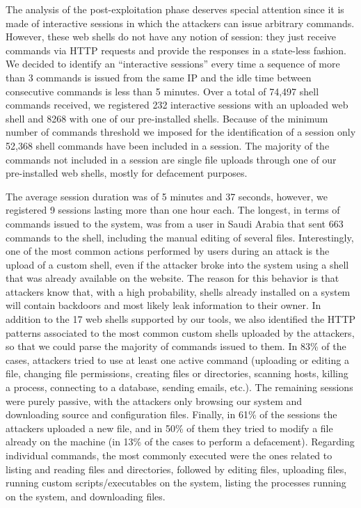 The analysis of the post-exploitation phase deserves special attention since it is made of interactive sessions in which the attackers can issue arbitrary commands. However, these web shells do not have any notion of session: they just receive commands via HTTP requests and provide the responses in a state-less fashion. We decided to identify an ``interactive sessions'' every time a sequence of more than 3 commands is issued from the same IP and the idle time between consecutive commands is less than 5 minutes.
Over a total of 74,497 shell commands received, we registered 232 interactive sessions with an uploaded web shell and 8268 with one of our pre-installed shells. Because of the minimum number of commands threshold we imposed for the identification of a session only 52,368 shell commands have been included in a session. The majority of the commands not included in a session are single file uploads through one of our pre-installed web shells, mostly for defacement purposes.

The average session duration was of 5 minutes and 37 seconds, however, we registered 9 sessions lasting more than one hour each. The longest, in terms of commands issued to the system, was from a user in Saudi Arabia that sent 663 commands to the shell, including the manual editing of several files. Interestingly, one of the most common actions performed by users during an attack is the upload of a custom shell, even if the attacker broke into the system using a shell that was already available on the website. The reason for this behavior is that attackers know that, with a high probability, shells already installed on a system will contain backdoors and most likely leak information to their owner. In addition to the 17 web shells supported by our tools, we also identified the HTTP patterns associated to the most common custom shells uploaded by the attackers, so that we could parse the majority of commands issued to them.
In 83\% of the cases, attackers tried to use at least one active command (uploading or editing a file, changing file permissions, creating files or directories, scanning hosts, killing a process, connecting to a database, sending emails, etc.). The remaining sessions were purely passive, with the attackers only browsing our system and downloading source and configuration files.
Finally, in 61\% of the sessions the attackers uploaded a new file, and in 50\% of them they tried to modify a file already on the machine (in 13\% of the cases to perform a defacement). Regarding individual commands, the most commonly executed were the ones related to listing and reading files and directories, followed by editing files, uploading files, running custom scripts/executables on the system, listing the processes running on the system, and downloading files.

